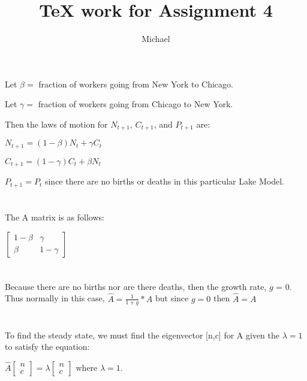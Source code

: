 \documentclass[11pt, oneside]{article}   	%
\title{TeX work for Assignment 4}
\author{Michael}
\begin{document}
\maketitle

\section{}

Let $\beta = $ fraction of workers going from New York to Chicago.

Let $\gamma= $ fraction of workers going from Chicago to New York.

Then the laws of motion for $N_{t+1}$, $C_{t+1}$, and $P_{t+1}$ are:

$N_{t+1} = (1-\beta)N_t + \gamma C_t$

$C_{t+1} = (1-\gamma)C_t + \beta N_t$

$P_{t+1} = P_t$ since there are no births or deaths in this particular Lake Model.

\section{}

The A matrix is as follows:

$\begin{bmatrix}
1-\beta & \gamma \\
\beta & 1-\gamma
\end{bmatrix}$

\section{}
Because there are no births nor are there deaths, then the growth rate, $g$ = 0. 
Thus normally in this case, $\hat{A} = \frac{1}{1+g}*A$ but since $g=0$ then $\hat{A}=A$

\section{}
To find the steady state, we must find the eigenvector [n,c] for A given the $\lambda = 1$ to satisfy the equation: 

$\hat{A}\left[ \begin{array}{c} n \\ c \end{array} \right] = \lambda \left[ \begin{array}{c} n \\ c \end{array} \right]$ where $\lambda = 1$. 
\end{document}
